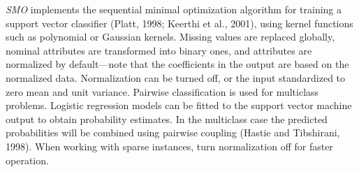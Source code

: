 \textit{SMO} implements the sequential minimal optimization algorithm for
training a support vector classifier (Platt, 1998; Keerthi
et al., 2001), using kernel
functions such as polynomial or Gaussian kernels. Missing values are replaced globally, nominal
attributes are transformed into binary ones, and attributes are
normalized by default---note that the coefficients in the output are
based on the normalized data. Normalization can be turned off, or the
input standardized to zero mean and unit variance. Pairwise
classification is used for multiclass problems. Logistic regression
models can be fitted to the support vector machine output to obtain
probability estimates. In the multiclass case the predicted
probabilities will be combined using pairwise coupling (Hastie and
Tibshirani, 1998). When working with sparse instances, turn
normalization off for faster operation.

